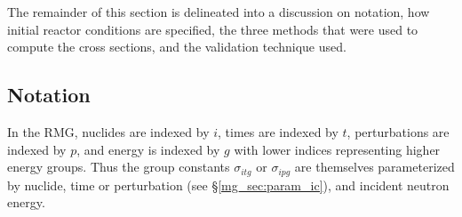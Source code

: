 The remainder of this section is delineated into a discussion on notation, how initial 
reactor conditions are specified, the three methods that were used to compute the
cross sections, and the validation technique used.

\subsection{Notation}
\label{mg_sec:notation}
In the RMG, nuclides are indexed by $i$, times are indexed by $t$, perturbations are indexed by $p$, 
and energy is indexed by $g$ with lower indices representing higher energy groups.
Thus the group constants $\sigma_{itg}$ or $\sigma_{ipg}$ are themselves parameterized by nuclide, 
time or perturbation (see \S \ref{mg_sec:param_ic}), and incident neutron energy.  


